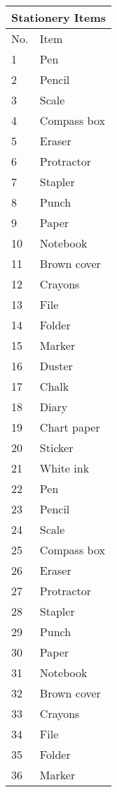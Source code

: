 \documentclass{article}
\begin{document}
	\large
	\begin{longtable}{|l|l|}
		\hline
		\multicolumn{2}{|c|}{Stationery Items} \\
		\hline
		No. & Item\\
		\hline
		\endhead
		1 & Pen\\
		\hline
		2 & Pencil\\
		\hline
		3 & Scale\\
		\hline
		4 & Compass box\\
		\hline
		5 & Eraser\\
		\hline
		6 & Protractor\\
		\hline
		7 & Stapler\\
		\hline
		8 & Punch\\
		\hline
		9 & Paper\\
		\hline
		10 & Notebook\\
		\hline
		11 & Brown cover\\
		\hline
		12 & Crayons\\
		\hline
		13 & File\\
		\hline
		14 & Folder\\
		\hline
		15 & Marker\\
		\hline
		16 & Duster\\
		\hline
		17 & Chalk\\
		\hline
		18 & Diary\\
		\hline
		19 & Chart paper\\
		\hline
		20 & Sticker\\
		\hline
		21 & White ink\\
		\hline
		22 & Pen\\
		\hline
		23 & Pencil\\
		\hline
		24 & Scale\\
		\hline
		25 & Compass box\\
		\hline
		26 & Eraser\\
		\hline
		27 & Protractor\\
		\hline
		28 & Stapler\\
		\hline
		29 & Punch\\
		\hline
		30 & Paper\\
		\hline
		31 & Notebook\\
		\hline
		32 & Brown cover\\
		\hline
		33 & Crayons\\
		\hline
		34 & File\\
		\hline
		35 & Folder\\
		\hline
		36 & Marker\\

\end{longtable}
\end{document}
